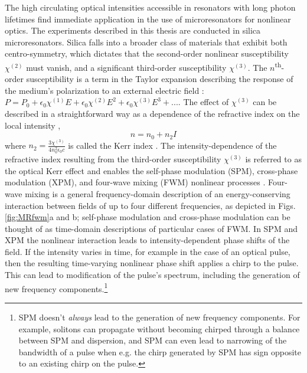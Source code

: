 The high circulating optical intensities accessible in resonators with long photon lifetimes find immediate application in the use of microresonators for nonlinear optics. The experiments described in this thesis are conducted in silica microresonators. Silica falls into a broader class of materials that exhibit both centro-symmetry, which dictates that the second-order nonlinear susceptibility $\chi^{(2)}$ must vanish, and a significant third-order susceptibility $\chi^{(3)}$. The $n$\textsuperscript{th}-order susceptibility is a term in the Taylor expansion describing the response of the medium's polarization to an external electric field \cite{Boyd2003}: $P=P_0+\epsilon_0 \chi^{(1)} E + \epsilon_0 \chi^{(2)} E^2 + \epsilon_0 \chi^{(3)} E^3+...$. The effect of $\chi^{(3)}$ can be described in a straightforward way as a dependence of the refractive index on the local intensity \cite{Agrawal2007},
\begin{equation}
n=n_0+n_2 I \label{eq:KerrIndex}
\end{equation}
where $n_2=\frac{3\chi^{(3)}}{4n_0^2\epsilon_0 c}$ is called the Kerr index \cite{DelCoso2004,Agrawal2007}. The intensity-dependence of the refractive index resulting from the third-order susceptibility $\chi^{(3)}$ is referred to as the optical Kerr effect and enables the self-phase modulation (SPM), cross-phase modulation (XPM), and four-wave mixing (FWM) nonlinear processes \cite{Boyd2003}. Four-wave mixing is a general frequency-domain description of an energy-conserving interaction between fields of up to four different frequencies, as depicted in Figs. \ref{fig:MRfwm}a and b; self-phase modulation and cross-phase modulation can be thought of as time-domain descriptions of particular cases of FWM. In SPM and XPM the nonlinear interaction leads to intensity-dependent phase shifts of the field. If the intensity varies in time, for example in the case of an optical pulse, then the resulting time-varying nonlinear phase shift applies a chirp to the pulse. This can lead to modification of the pulse's spectrum, including the generation of new frequency components.\footnote{SPM doesn't \textit{always} lead to the generation of new frequency components. For example, solitons can propagate without becoming chirped through a balance between SPM and dispersion, and SPM can even lead to narrowing of the bandwidth of a pulse when e.g. the chirp generated by SPM has sign opposite to an existing chirp on the pulse.}



